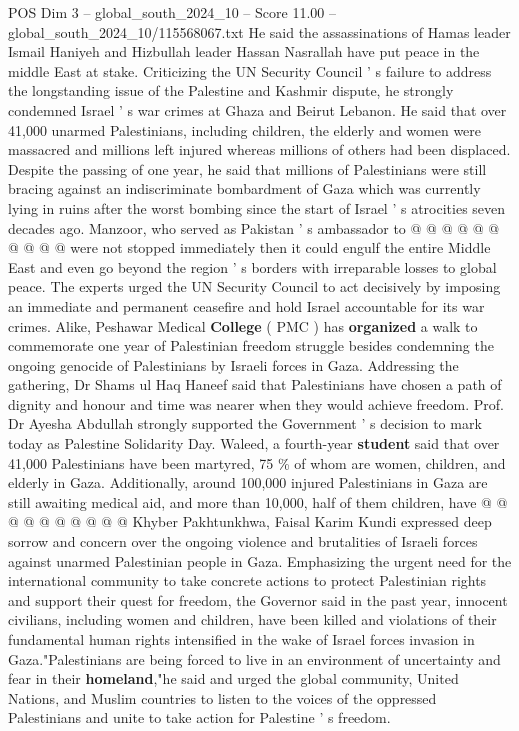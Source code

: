 \begin{textsample}{POS Dim 3 – global\_south\_2024\_10 – Score 11.00 – global\_south\_2024\_10/115568067.txt}
He said the assassinations of Hamas leader Ismail Haniyeh and Hizbullah leader Hassan Nasrallah have put peace in the middle East at stake.
Criticizing the UN Security Council ' s failure to address the longstanding issue of the Palestine and Kashmir dispute, he strongly condemned Israel ' s war crimes at Ghaza and Beirut Lebanon.
He said that over 41,000 unarmed Palestinians, including children, the elderly and women were massacred and millions left injured whereas millions of others had been displaced.
Despite the passing of one year, he said that millions of Palestinians were still bracing against an indiscriminate bombardment of Gaza which was currently lying in ruins after the worst bombing since the start of Israel ' s atrocities seven decades ago.
Manzoor, who served as Pakistan ' s ambassador to @ @ @ @ @ @ @ @ @ @ were not stopped immediately then it could engulf the entire Middle East and even go beyond the region ' s borders with irreparable losses to global peace.
The experts urged the UN Security Council to act decisively by imposing an immediate and permanent ceasefire and hold Israel accountable for its war crimes.
Alike, Peshawar Medical \textbf{College} ( PMC ) has \textbf{organized} a walk to commemorate one year of Palestinian freedom struggle besides condemning the ongoing genocide of Palestinians by Israeli forces in Gaza.
Addressing the gathering, Dr Shams ul Haq Haneef said that Palestinians have chosen a path of dignity and honour and time was nearer when they would achieve freedom.
Prof.
Dr Ayesha Abdullah strongly supported the Government ' s decision to mark today as Palestine Solidarity Day.
Waleed, a fourth-year \textbf{student} said that over 41,000 Palestinians have been martyred, 75 \% of whom are women, children, and elderly in Gaza.
Additionally, around 100,000 injured Palestinians in Gaza are still awaiting medical aid, and more than 10,000, half of them children, have @ @ @ @ @ @ @ @ @ @ Khyber Pakhtunkhwa, Faisal Karim Kundi expressed deep sorrow and concern over the ongoing violence and brutalities of Israeli forces against unarmed Palestinian people in Gaza.
Emphasizing the urgent need for the international community to take concrete actions to protect Palestinian rights and support their quest for freedom, the Governor said in the past year, innocent civilians, including women and children, have been killed and violations of their fundamental human rights intensified in the wake of Israel forces invasion in Gaza."Palestinians are being forced to live in an environment of uncertainty and fear in their \textbf{homeland},"he said and urged the global community, United Nations, and Muslim countries to listen to the voices of the oppressed Palestinians and unite to take action for Palestine ' s freedom.

\end{textsample}
